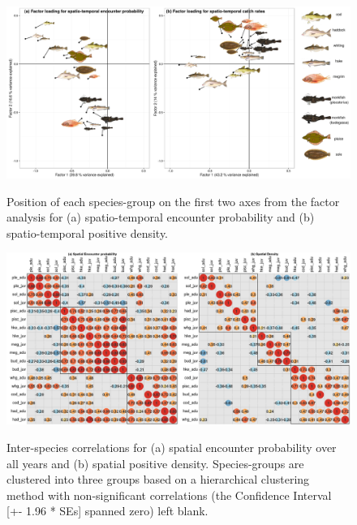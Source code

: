\documentclass{nature}
\begin{document}
\begin{figure}
\begin{center}
	\includegraphics[width=\linewidth]{"Figure 3 - PCAstyle_Plots_SpatioTemp"}
	\label{fig:2}
	\caption{Position of each species-group on the first two axes from the
		factor analysis for (a) spatio-temporal encounter probability
		and (b) spatio-temporal positive density.}
\end{center}
\end{figure}

\begin{figure}
\begin{center}
	\includegraphics[width = \linewidth]{"Figure 1 - Omega1Omega2_Correlations_blank"}
	\label{fig:3}
	\caption{Inter-species correlations for (a) spatial encounter
		probability over all years and (b) spatial positive density.
		Species-groups are clustered into three groups based on a
		hierarchical clustering method with non-significant
		correlations (the Confidence Interval [+- 1.96 * SEs] spanned
		zero) left blank.}
	\end{center}
\end{figure}
\end{document}
